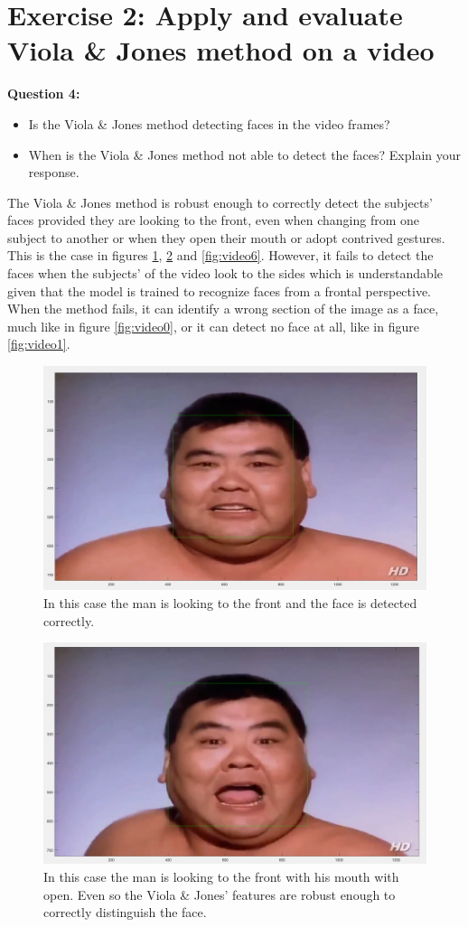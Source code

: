 \section{Exercise 2: Apply and evaluate Viola \& Jones method on a video}

{\bfseries
Question 4:
\begin{itemize}
\item Is the Viola \& Jones method detecting faces in the video frames?
\item When is the Viola \& Jones method not able to detect the faces? Explain
			your response.
\end{itemize}
}

The Viola \& Jones method is robust enough to correctly detect the subjects' faces provided they are looking to the front, even when changing from one subject to another or when they open their mouth or adopt contrived gestures. This is the case in figures \ref{fig:video2}, \ref{fig:video4} and \ref{fig:video6}. However, it fails to detect the faces when the subjects' of the video look to the sides which is understandable given that the model is trained to recognize faces from a frontal perspective. When the method fails, it can identify a wrong section of the image as a face, much like in figure \ref{fig:video0}, or it can detect no face at all, like in figure \ref{fig:video1}.

\begin{figure}[h!tb]
	\centering
		\includegraphics[width=0.6 \textwidth]{./img/ex2/screenshot2.png}
	\caption[The man is looking to the front]{ In this case the man is looking to the front and the face is detected correctly. }
	\label{fig:video2}
\end{figure}

\begin{figure}[h!tb]
	\centering
		\includegraphics[width=0.6 \textwidth]{./img/ex2/screenshot4.png}
	\caption[The man is looking to the front with his mouth wide open]{ In this case the man is looking to the front with his mouth with open. Even so the Viola \& Jones' features are robust enough to correctly distinguish the face. }
	\label{fig:video4}
\end{figure}

